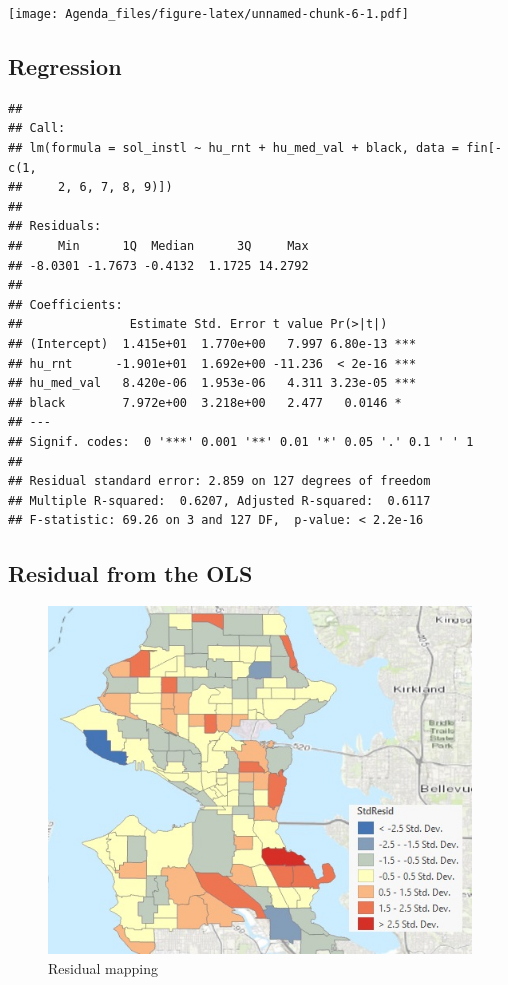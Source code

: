 \documentclass[]{article}
\begin{document}
\texttt{[image: Agenda\_files/figure-latex/unnamed-chunk-6-1.pdf]}

\subsection{Regression}\label{regression}

\begin{verbatim}
## 
## Call:
## lm(formula = sol_instl ~ hu_rnt + hu_med_val + black, data = fin[-c(1, 
##     2, 6, 7, 8, 9)])
## 
## Residuals:
##     Min      1Q  Median      3Q     Max 
## -8.0301 -1.7673 -0.4132  1.1725 14.2792 
## 
## Coefficients:
##               Estimate Std. Error t value Pr(>|t|)    
## (Intercept)  1.415e+01  1.770e+00   7.997 6.80e-13 ***
## hu_rnt      -1.901e+01  1.692e+00 -11.236  < 2e-16 ***
## hu_med_val   8.420e-06  1.953e-06   4.311 3.23e-05 ***
## black        7.972e+00  3.218e+00   2.477   0.0146 *  
## ---
## Signif. codes:  0 '***' 0.001 '**' 0.01 '*' 0.05 '.' 0.1 ' ' 1
## 
## Residual standard error: 2.859 on 127 degrees of freedom
## Multiple R-squared:  0.6207, Adjusted R-squared:  0.6117 
## F-statistic: 69.26 on 3 and 127 DF,  p-value: < 2.2e-16
\end{verbatim}

\subsection{Residual from the OLS}\label{residual-from-the-ols}

\begin{figure}
\centering
\includegraphics{./Figs/Residual.jpg}
\caption{Residual mapping}
\end{figure}
\end{document}
